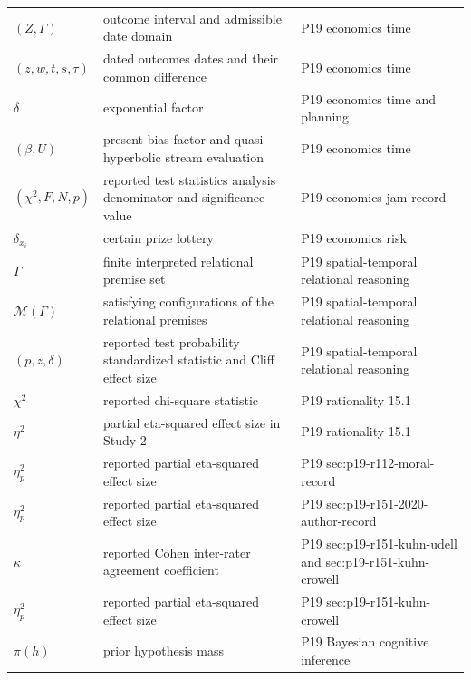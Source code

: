 \begin{longtable}{@{}p{}p{}p{}@{}}
\((Z,\allowbreak \Gamma)\) & outcome interval and admissible date domain & P19 economics time \\
\((z,\allowbreak w,\allowbreak t,\allowbreak s,\allowbreak \tau)\) & dated outcomes dates and their common difference & P19 economics time \\
\(\delta\) & exponential factor & P19 economics time and planning \\
\((\beta,\allowbreak U)\) & present-bias factor and quasi-hyperbolic stream evaluation & P19 economics time \\
\((\chi^2,\allowbreak F,\allowbreak N,\allowbreak p)\) & reported test statistics analysis denominator and significance value & P19 economics jam record \\
\(\delta_{x_i}\) & certain prize lottery & P19 economics risk \\
\(\Gamma\) & finite interpreted relational premise set & P19 spatial-\allowbreak{}temporal relational reasoning \\
\(\mathcal M(\Gamma)\) & satisfying configurations of the relational premises & P19 spatial-\allowbreak{}temporal relational reasoning \\
\((p,\allowbreak z,\allowbreak \delta)\) & reported test probability standardized statistic and Cliff effect size & P19 spatial-\allowbreak{}temporal relational reasoning \\
\(\chi^2\) & reported chi-square statistic & P19 rationality 15.\allowbreak{}1 \\
\(\eta^2\) & partial eta-squared effect size in Study 2 & P19 rationality 15.\allowbreak{}1 \\
\(\eta_p^2\) & reported partial eta-squared effect size & P19 sec:\allowbreak{}p19-\allowbreak{}r112-\allowbreak{}moral-\allowbreak{}record \\
\(\eta_p^2\) & reported partial eta-squared effect size & P19 sec:\allowbreak{}p19-\allowbreak{}r151-\allowbreak{}2020-\allowbreak{}author-\allowbreak{}record \\
\(\kappa\) & reported Cohen inter-rater agreement coefficient & P19 sec:\allowbreak{}p19-\allowbreak{}r151-\allowbreak{}kuhn-\allowbreak{}udell and sec:\allowbreak{}p19-\allowbreak{}r151-\allowbreak{}kuhn-\allowbreak{}crowell \\
\(\eta_p^2\) & reported partial eta-squared effect size & P19 sec:\allowbreak{}p19-\allowbreak{}r151-\allowbreak{}kuhn-\allowbreak{}crowell \\
\(\pi(h)\) & prior hypothesis mass & P19 Bayesian cognitive inference \\

\end{longtable}
